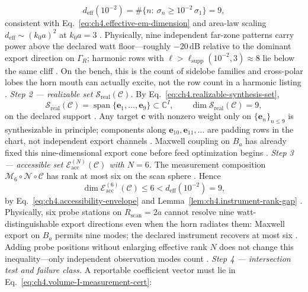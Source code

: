 \begin{equation}
\label{eq:ch4.flagship-deff-count}
d_{\mathrm{eff}}(10^{-2})
=
\#\{n:\ \sigma_{n}\ge10^{-2}\,\sigma_{1}\}
=
9,
\end{equation}
consistent with Eq.~\eqref{eq:ch4.effective-em-dimension} and area-law scaling $d_{\mathrm{eff}}\sim(k_{0}a)^{2}$ at $k_{0}a=3$ . Physically, nine independent far-zone patterns carry power above the declared watt floor---roughly $-20\,\mathrm{dB}$ relative to the dominant export direction on $\Gamma_{R}$; harmonic rows with $\ell> \ell_{\mathrm{supp}}(10^{-2},3)\approx8$ lie below the same cliff . On the bench, this is the count of sidelobe families and cross-polar lobes the horn mouth can actually excite, not the row count in a harmonic listing .
\emph{Step 2 --- realizable set $\mathcal{S}_{\mathrm{real}}(\mathcal{C})$.} By Eq.~\eqref{eq:ch4.realizable-synthesis-set},
\begin{equation}
\label{eq:ch4.flagship-sreal-dim}
\mathcal{S}_{\mathrm{real}}(\mathcal{C})
=
\operatorname{span}\{\mathbf{e}_{1},\ldots,\mathbf{e}_{9}\}
\subset\mathbb{C}^{I},
\qquad
\dim\mathcal{S}_{\mathrm{real}}(\mathcal{C})=9,
\end{equation}
on the declared support . Any target $\mathbf{c}$ with nonzero weight only on $\{\mathbf{e}_{n}\}_{n\le 9}$ is synthesizable in principle; components along $\mathbf{e}_{10},\mathbf{e}_{11},\ldots$ are padding rows in the chart, not independent export channels . Maxwell coupling on $B_{a}$ has already fixed this nine-dimensional export cone before feed optimization begins .
\emph{Step 3 --- accessible set $\mathcal{E}_{\mathrm{acc}}^{(N)}(\mathcal{C})$ with $N=6$.} The measurement composition $\mathcal{M}_{6}\circ\mathcal{N}\circ\mathcal{C}$ has rank at most six on the scan sphere . Hence
\begin{equation}
\label{eq:ch4.flagship-eacc-rank}
\dim\mathcal{E}_{\mathrm{acc}}^{(6)}(\mathcal{C})
\le
6
<
d_{\mathrm{eff}}(10^{-2})=9,
\end{equation}
by Eq.~\eqref{eq:ch4.accessibility-envelope} and Lemma~\ref{lem:ch4.instrument-rank-gap} . Physically, six probe stations on $R_{\mathrm{scan}}=2a$ cannot resolve nine watt-distinguishable export directions even when the horn radiates them: Maxwell export on $B_{a}$ permits nine modes; the declared instrument recovers at most six . Adding probe positions without enlarging effective rank $N$ does not change this inequality---only independent observation modes count .
\emph{Step 4 --- intersection test and failure class.} A reportable coefficient vector must lie in Eq.~\eqref{eq:ch4.volume-I-measurement-cert}:
